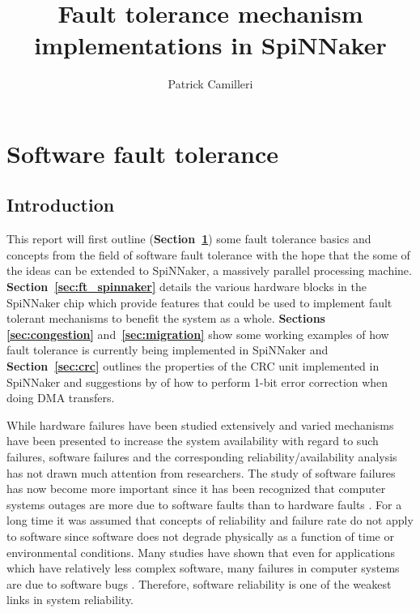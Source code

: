\documentclass[a4paper, 11pt]{article}
\title{Fault tolerance mechanism implementations in SpiNNaker}
\author{Patrick Camilleri}
\date{}
\begin{document}
\maketitle

\tableofcontents

\newpage
\section{Software fault tolerance}
\label{sec:software_ft}

\subsection{Introduction}
This report will first outline (\textbf{Section~\ref{sec:software_ft}}) some fault tolerance basics and concepts from the field of software fault tolerance \citep{trivedi2008software} with the hope that the some of the ideas can be extended to SpiNNaker, a massively parallel processing machine. \textbf{Section~\ref{sec:ft_spinnaker}} details the various hardware blocks in the SpiNNaker chip which provide features that could be used to implement fault tolerant mechanisms to benefit the system as a whole. \textbf{Sections \ref{sec:congestion}} and~\textbf{\ref{sec:migration}} show some working examples of how fault tolerance is currently being implemented in SpiNNaker and \textbf{Section~\ref{sec:crc}} outlines the properties of the CRC unit implemented in SpiNNaker and suggestions by \citet{grymel2013error} of how to perform 1-bit error correction when doing DMA transfers.

While hardware failures have been studied extensively and varied mechanisms have been presented to increase the system availability with regard to such failures, software failures and the corresponding reliability/availability analysis has not drawn much attention from researchers. The study of software failures has now become more important since it has been recognized that computer systems outages are more due to software faults than to hardware faults \citep{gray1991high}. For a long time it was assumed that concepts of reliability and failure rate do not apply to software since software does not degrade physically as a function of time or environmental conditions. Many studies have shown that even for applications which have relatively less complex software, many failures in computer systems are due to software bugs \citep{pradhan1996fault}. Therefore, software reliability is one of the weakest links in system reliability.
\end{document}
